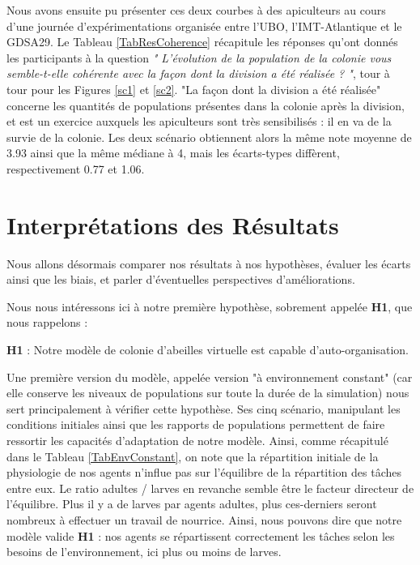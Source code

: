 	Nous avons ensuite pu présenter ces deux courbes à des apiculteurs au cours d'une journée d'expérimentations organisée entre l'UBO, l'IMT-Atlantique et le GDSA29. Le Tableau \ref{TabResCoherence} récapitule les réponses qu'ont donnés les participants à la question \textit{" L'évolution de la population de la colonie vous semble-t-elle cohérente avec la façon dont la division a été réalisée ? "}, tour à tour pour les Figures \ref{sc1} et \ref{sc2}. "La façon dont la division a été réalisée" concerne les quantités de populations présentes dans la colonie après la division, et est un exercice auxquels les apiculteurs sont très sensibilisés : il en va de la survie de la colonie. Les deux scénario obtiennent alors la même note moyenne de 3.93 ainsi que la même médiane à 4, mais les écarts-types diffèrent, respectivement 0.77 et 1.06.
	
	
	\section{Interprétations des Résultats}

	Nous allons désormais comparer nos résultats à nos hypothèses, évaluer les écarts ainsi que les biais, et parler d'éventuelles perspectives d'améliorations.
	
		Nous nous intéressons ici à notre première hypothèse, sobrement appelée \textbf{H1}, que nous rappelons : 
		
		\textbf{H1} : Notre modèle de colonie d'abeilles virtuelle est capable d'auto-organisation.
		
		Une première version du modèle, appelée version "à environnement constant" (car elle conserve les niveaux de populations sur toute la durée de la simulation) nous sert principalement à vérifier cette hypothèse. Ses cinq scénario, manipulant les conditions initiales ainsi que les rapports de populations permettent de faire ressortir les capacités d'adaptation de notre modèle. Ainsi, comme récapitulé dans le Tableau \ref{TabEnvConstant}, on note que la répartition initiale de la physiologie de nos agents n'influe pas sur l'équilibre de la répartition des tâches entre eux. Le ratio adultes / larves en revanche semble être le facteur directeur de l'équilibre. Plus il y a de larves par agents adultes, plus ces-derniers seront nombreux à effectuer un travail de nourrice. Ainsi, nous pouvons dire que notre modèle valide \textbf{H1} : nos agents se répartissent correctement les tâches selon les besoins de l'environnement, ici plus ou moins de larves.
		
